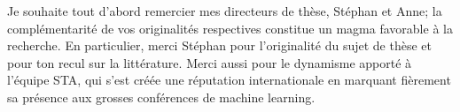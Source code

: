 \begin{acknowledgements}
  Je souhaite tout d'abord remercier mes directeurs de thèse, Stéphan et Anne; la complémentarité de vos originalités respectives constitue un magma favorable à la recherche. En particulier, merci Stéphan pour l'originalité du sujet de thèse et pour ton recul sur la littérature. Merci aussi pour le dynamisme apporté à l'équipe STA, qui s'est créée une réputation internationale en marquant fièrement sa présence aux grosses conférences de machine learning.

\end{acknowledgements}

